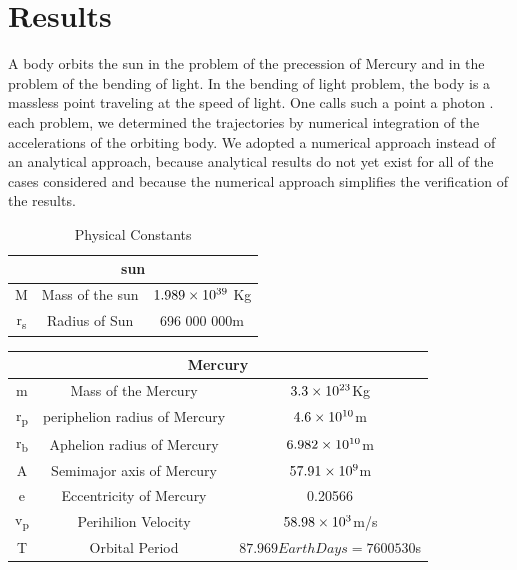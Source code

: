 \documentclass[12pt]{article}
\begin{document}
\section{Results}
A body orbits the sun in the problem of the precession of
Mercury and in the problem of the bending of light. In the
bending of light problem, the body is a massless point traveling at the speed of light. One calls such a point a photon .
each problem, we determined the trajectories by numerical
integration of the accelerations of the orbiting body. We
adopted a numerical approach instead of an analytical
approach, because analytical results do not yet exist for all of
the cases considered and because the numerical approach
simplifies the verification of the results. 
\begin{table}[h!]
    \centering
    \caption{Physical Constants}
    \begin{tabular}{ccc}
    \hline
         \multicolumn{3}{c}{sun}  \\
         \hline
         M & Mass of the sun & $1.989\times10\textsuperscript{39}$ Kg \\
         \hline
         r\textsubscript{s} & Radius of Sun & 696 000 000m \\
         \hline
    \end{tabular}
    \label{tab:my_label}
\end{table}

\begin{table}[h!]
    \centering
    \begin{tabular}{ccc}
         \multicolumn{3}{c}{Mercury}  \\
         \hline
         m & Mass of the Mercury & $3.3\times10\textsuperscript{23}$Kg \\
         \hline
         r\textsubscript{p} & periphelion radius of Mercury & $4.6\times10\textsuperscript{10}$m \\
         \hline
         r\textsubscript{b} & Aphelion radius of Mercury & $6.982\times10\textsuperscript{10}$m \\
         \hline
         A & Semimajor axis of Mercury & $57.91\times10\textsuperscript{9}$m \\
         \hline
         e & Eccentricity of Mercury & 0.20566\\
         \hline
         v\textsubscript{p} & Perihilion Velocity & $58.98\times10\textsuperscript{3}$m/s\\
         \hline
         T & Orbital Period & $ 87.969 Earth Days=7600530 $s \\
         \hline
    \end{tabular}
    \label{tab:my_label}
\end{table}
\end{document}
